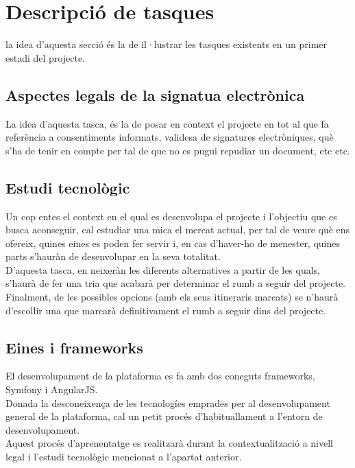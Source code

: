 \section{Descripció de tasques}
la idea d'aquesta secció és la de il·lustrar les tasques existents en un primer estadi del projecte.

\subsection{Aspectes legals de la signatua electrònica}
La idea d'aquesta tasca, és la de posar en context el projecte en tot al que fa referència a consentiments informats, validesa de signatures electròniques, què s'ha de tenir en compte per tal de que no es pugui repudiar un document, etc etc.

\subsection{Estudi tecnològic}
Un cop entes el context en el qual es desenvolupa el projecte i l'objectiu que es busca aconseguir, cal estudiar una mica el mercat actual, per tal de veure què ens ofereix, quines eines es poden fer servir i, en cas d'haver-ho de menester, quines parts s'hauràn de desenvolupar en la seva totalitat.\\
\newline D'aquesta tasca, en neixeràn les diferents alternatives a partir de les quals, s'haurà de fer una tria que acabarà per determinar el rumb a seguir del projecte.\\
\newline Finalment,  de les possibles opcions (amb els seus itineraris marcats) se n'haurà d'escollir una que marcarà definitivament el rumb a seguir dins del projecte.

\subsection{Eines i frameworks}
El desenvolupament de la plataforma es fa amb dos coneguts frameworks, Symfony i AngularJS.\\
Donada la desconeixença de les tecnologíes emprades per al desenvolupament general de la plataforma, cal un petit procés d'habituallament a l'entorn de desenvolupament.\\
Aquest procés d'aprenentatge es realitzarà durant la contextualització a nivell legal i l'estudi tecnològic mencionat a l'apartat anterior.

